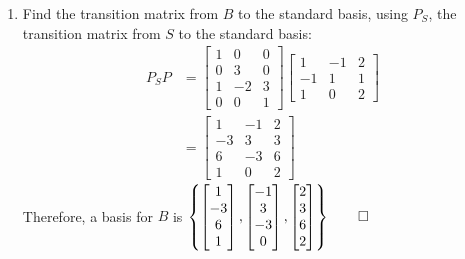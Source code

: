 \documentclass[12pt, a4paper]{article}
\begin{document}
\begin{enumerate}[Q\arabic*.]
\begin{enumerate}[(\alph*)]
    \item Find the transition matrix from $B$ to the standard basis, using $P_S$, the transition matrix from $S$ to the standard basis: 
      \begin{align*}
        P_SP &= \begin{bmatrix}1&0&0\\0&3&0\\1&-2&3\\0&0&1\end{bmatrix}\begin{bmatrix}1&-1&2\\-1&1&1\\1&0&2\end{bmatrix}\\
             &= \begin{bmatrix}1&-1&2\\-3&3&3\\6&-3&6\\1&0&2\end{bmatrix}
      \end{align*}
      Therefore, a basis for $B$ is $\left\{\begin{bmatrix}1\\-3\\6\\1\end{bmatrix},\begin{bmatrix}-1\\3\\-3\\0\end{bmatrix},\begin{bmatrix}2\\3\\6\\2\end{bmatrix}\right\} \qed$
  \end{enumerate}


\end{enumerate}
\end{document}

